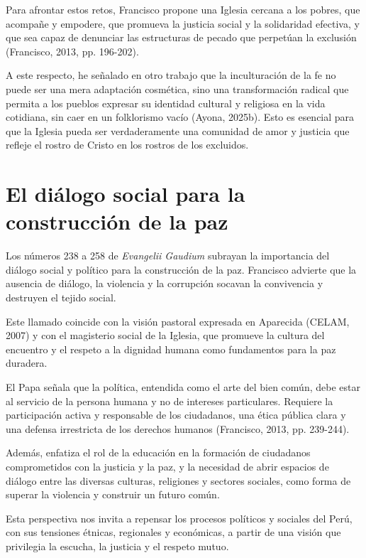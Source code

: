 \documentclass[12pt]{article}
\begin{document}
	Para afrontar estos retos, Francisco propone una Iglesia cercana a los pobres, que acompañe y empodere, que promueva la justicia social y la solidaridad efectiva, y que sea capaz de denunciar las estructuras de pecado que perpetúan la exclusión (Francisco, 2013, pp. 196-202)\nocite{Francisco2013}.
	
	A este respecto, he señalado en otro trabajo que la inculturación de la fe no puede ser una mera adaptación cosmética, sino una transformación radical que permita a los pueblos expresar su identidad cultural y religiosa en la vida cotidiana, sin caer en un folklorismo vacío (Ayona, 2025b)\nocite{Ayona2025b}. Esto es esencial para que la Iglesia pueda ser verdaderamente una comunidad de amor y justicia que refleje el rostro de Cristo en los rostros de los excluidos.
	
	\section{El diálogo social para la construcción de la paz}
	
	Los números 238 a 258 de \textit{Evangelii Gaudium} subrayan la importancia del diálogo social y político para la construcción de la paz. Francisco advierte que la ausencia de diálogo, la violencia y la corrupción socavan la convivencia y destruyen el tejido social.
	
	Este llamado coincide con la visión pastoral expresada en Aparecida (CELAM, 2007)\nocite{CELAM2007} y con el magisterio social de la Iglesia, que promueve la cultura del encuentro y el respeto a la dignidad humana como fundamentos para la paz duradera.
	
	El Papa señala que la política, entendida como el arte del bien común, debe estar al servicio de la persona humana y no de intereses particulares. Requiere la participación activa y responsable de los ciudadanos, una ética pública clara y una defensa irrestricta de los derechos humanos (Francisco, 2013, pp. 239-244)\nocite{Francisco2013}.
	
	Además, enfatiza el rol de la educación en la formación de ciudadanos comprometidos con la justicia y la paz, y la necesidad de abrir espacios de diálogo entre las diversas culturas, religiones y sectores sociales, como forma de superar la violencia y construir un futuro común.
	
	Esta perspectiva nos invita a repensar los procesos políticos y sociales del Perú, con sus tensiones étnicas, regionales y económicas, a partir de una visión que privilegia la escucha, la justicia y el respeto mutuo.
	
\end{document}
